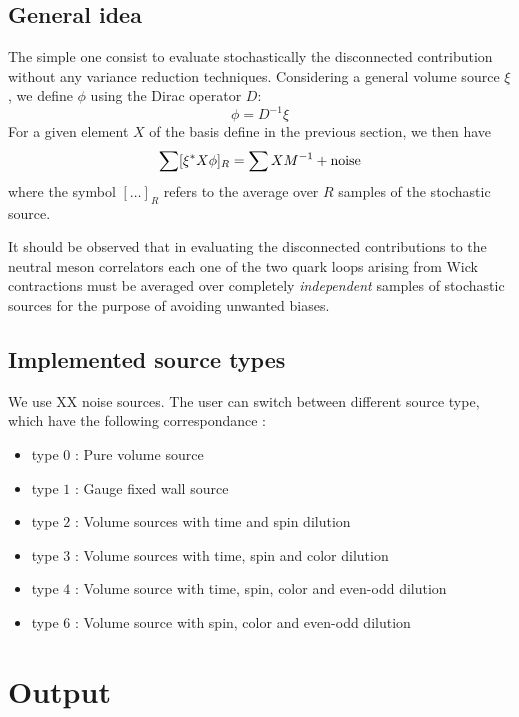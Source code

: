 \documentclass[a4paper]{article}
\newcommand{\be}{\begin{equation}}
\newcommand{\ee}{\end{equation}}
\begin{document}
\subsection{General idea}

The simple one consist to evaluate stochastically the disconnected contribution without any variance reduction techniques.
Considering a general volume source $\xi$, we define $\phi$ using the Dirac operator $D$:
\be
\phi = D^{-1} \xi
\ee
For a given element $X$ of the basis define in the previous section, we then have
 \begin{equation}
 \sum [\xi^* X \phi ]_R =
 \sum X M^{-1} + {\rm noise}
 \label{eq:B1}
 \end{equation}
 where the symbol $[\dots]_R$ refers to the average over $R$  samples of the stochastic source.

It should be observed that in evaluating the disconnected
contributions to the neutral  meson correlators each one of the two
quark loops arising from Wick contractions
 must be averaged over completely {\em independent} samples of
stochastic sources for the purpose of avoiding unwanted biases.



\subsection{Implemented source types}

We use XX noise sources.
The user can switch between different source type, which have the
following correspondance :

\begin{itemize}
\item{ type $0$ : Pure volume source}
\item{ type $1$ : Gauge fixed wall source }
\item{ type $2$ : Volume sources with  time and spin dilution}
\item{ type $3$ : Volume sources with  time, spin and  color dilution}
\item{ type $4$ : Volume source with  time, spin, color and even-odd
    dilution}
\item{type $6$ : Volume source with spin, color and even-odd dilution}
\end{itemize}


\section{Output}
\end{document}
